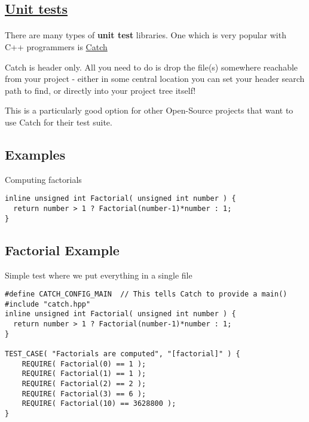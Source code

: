 \documentclass[%
oneside,                 %
final,                   %
10pt]{article}
\begin{document}
\subsection*{\href{{https://github.com/philsquared/Catch/blob/master/docs/tutorial.md}}{Unit tests}}

\paragraph{}
There are many types of \textbf{unit test} libraries. One which is very popular with C++ programmers is \href{{https://github.com/philsquared/Catch/blob/master/docs/tutorial.md}}{Catch}

Catch is header only. All you need to do is drop the file(s) somewhere reachable from your project - either in some central location you can set your header search path to find, or directly into your project tree itself! 

This is a particularly good option for other Open-Source projects that want to use Catch for their test suite.



\subsection*{Examples}

Computing factorials




\begin{verbatim}
inline unsigned int Factorial( unsigned int number ) {
  return number > 1 ? Factorial(number-1)*number : 1;
}

\end{verbatim}


\subsection*{Factorial Example}

Simple test where we put everything in a single file 
















\begin{verbatim}
#define CATCH_CONFIG_MAIN  // This tells Catch to provide a main()
#include "catch.hpp"
inline unsigned int Factorial( unsigned int number ) {
  return number > 1 ? Factorial(number-1)*number : 1;
}

TEST_CASE( "Factorials are computed", "[factorial]" ) {
    REQUIRE( Factorial(0) == 1 );
    REQUIRE( Factorial(1) == 1 );
    REQUIRE( Factorial(2) == 2 );
    REQUIRE( Factorial(3) == 6 );
    REQUIRE( Factorial(10) == 3628800 );
}


\end{verbatim}
\end{document}
